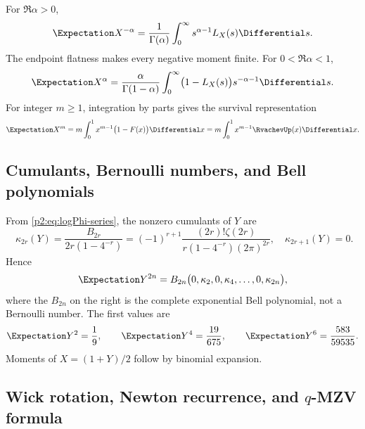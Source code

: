 \documentclass[11pt]{article}
\theoremstyle{definition}
\theoremstyle{remark}
\begin{document}
For $\Re\alpha>0$,
\begin{equation}
 \Expectation X^{-\alpha}=\frac{1}{\Gamma(\alpha)}
 \int_0^\infty s^{\alpha-1}L_X(s)\Differential s.                 \label{p2:eq:negative-moment-Mellin}
\end{equation}
The endpoint flatness makes every negative moment finite.  For $0<\Re\alpha<1$,
\begin{equation}
 \Expectation X^{\alpha}=\frac{\alpha}{\Gamma(1-\alpha)}
 \int_0^\infty\bigl(1-L_X(s)\bigr)s^{-\alpha-1}\Differential s. \label{p2:eq:positive-fractional-moment}
\end{equation}
For integer $m\ge1$, integration by parts gives the survival representation
\begin{equation}
 \Expectation X^m=m\int_0^1x^{m-1}\bigl(1-F(x)\bigr)\Differential x
 =m\int_0^1x^{m-1}\RvachevUp(x)\Differential x.                          \label{p2:eq:moments-survival}
\end{equation}

\subsection{Cumulants, Bernoulli numbers, and Bell polynomials}

From \eqref{p2:eq:logPhi-series}, the nonzero cumulants of $Y$ are
\begin{equation}
 \boxed{\quad
 \kappa_{2r}(Y)
 =\frac{B_{2r}}{2r(1-4^{-r})}
 =(-1)^{r+1}\frac{(2r)!\zeta(2r)}
 {r(1-4^{-r})(2\pi)^{2r}},
 \quad \kappa_{2r+1}(Y)=0.
 \quad}                                                  \label{p2:eq:Y-cumulants}
\end{equation}
Hence
\begin{equation}
 \Expectation Y^{2n}=B_{2n}\bigl(0,\kappa_2,0,\kappa_4,\dots,0,\kappa_{2n}\bigr), \label{p2:eq:Bell-moments}
\end{equation}
where the $B_{2n}$ on the right is the complete exponential Bell polynomial, not a Bernoulli
number.  The first values are
\begin{equation}
 \Expectation Y^2=\frac19,\qquad
 \Expectation Y^4=\frac{19}{675},\qquad
 \Expectation Y^6=\frac{583}{59535}.                               \label{p2:eq:first-moments}
\end{equation}
Moments of $X=(1+Y)/2$ follow by binomial expansion.

\subsection{Wick rotation, Newton recurrence, and \texorpdfstring{$q$}{q}-MZV formula}
\end{document}
